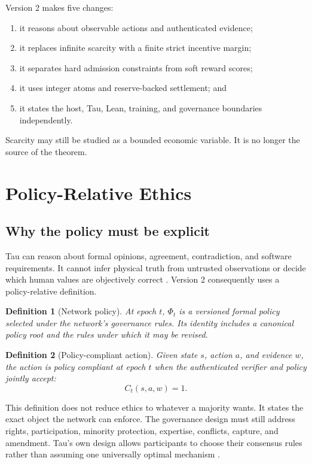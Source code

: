 \documentclass[11pt]{article}
\newtheorem{definition}{Definition}
\begin{document}
Version 2 makes five changes:

\begin{enumerate}
  \item it reasons about observable actions and authenticated evidence;
  \item it replaces infinite scarcity with a finite strict incentive margin;
  \item it separates hard admission constraints from soft reward scores;
  \item it uses integer atoms and reserve-backed settlement; and
  \item it states the host, Tau, Lean, training, and governance boundaries
  independently.
\end{enumerate}

Scarcity may still be studied as a bounded economic variable.  It is no longer
the source of the theorem.

\section{Policy-Relative Ethics}

\subsection{Why the policy must be explicit}

Tau can reason about formal opinions, agreement, contradiction, and software
requirements.  It cannot infer physical truth from untrusted observations or
decide which human values are objectively correct \cite{taunetwhitepaper}.
Version 2 consequently uses a policy-relative definition.

\begin{definition}[Network policy]
At epoch $t$, $\Phi_t$ is a versioned formal policy selected under the network's
governance rules.  Its identity includes a canonical policy root and the rules
under which it may be revised.
\end{definition}

\begin{definition}[Policy-compliant action]
Given state $s$, action $a$, and evidence $w$, the action is policy compliant at
epoch $t$ when the authenticated verifier and policy jointly accept:
\[
  C_t(s,a,w)=1.
\]
\end{definition}

This definition does not reduce ethics to whatever a majority wants.  It states
the exact object the network can enforce.  The governance design must still
address rights, participation, minority protection, expertise, conflicts,
capture, and amendment.  Tau's own design allows participants to choose their
consensus rules rather than assuming one universally optimal mechanism
\cite{taunetwhitepaper}.
\end{document}
